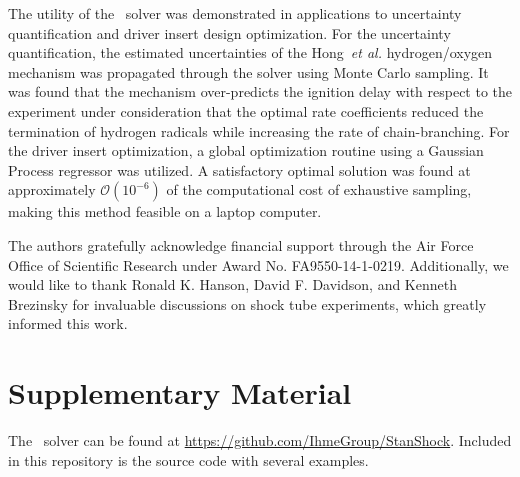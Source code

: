 The utility of the \stnshk\ solver was demonstrated in applications to uncertainty quantification and driver insert design optimization. For the uncertainty quantification, the estimated uncertainties of the Hong~\emph{et al.} hydrogen/oxygen mechanism was propagated through the solver using Monte Carlo sampling. It was found that the mechanism over-predicts the ignition delay with respect to the experiment under consideration that the optimal rate coefficients reduced the termination of hydrogen radicals while increasing the rate of chain-branching. For the driver insert optimization, a global optimization routine using a Gaussian Process regressor was utilized. A satisfactory optimal solution was found at approximately $\mathcal{O}(10^{-6})$ of the computational cost of exhaustive sampling, making this method feasible on a laptop computer. 
\begin{acknowledgements}

The authors gratefully acknowledge financial support through the Air Force Office of Scientific Research under Award No. FA9550-14-1-0219. Additionally, we would like to thank Ronald K. Hanson, David F. Davidson, and Kenneth Brezinsky for invaluable discussions on shock tube experiments, which greatly informed this work.
\end{acknowledgements}

\section{Supplementary Material}
The \stnshk\ solver can be found at \url{https://github.com/IhmeGroup/StanShock}. Included in this repository is the source code with several examples.



